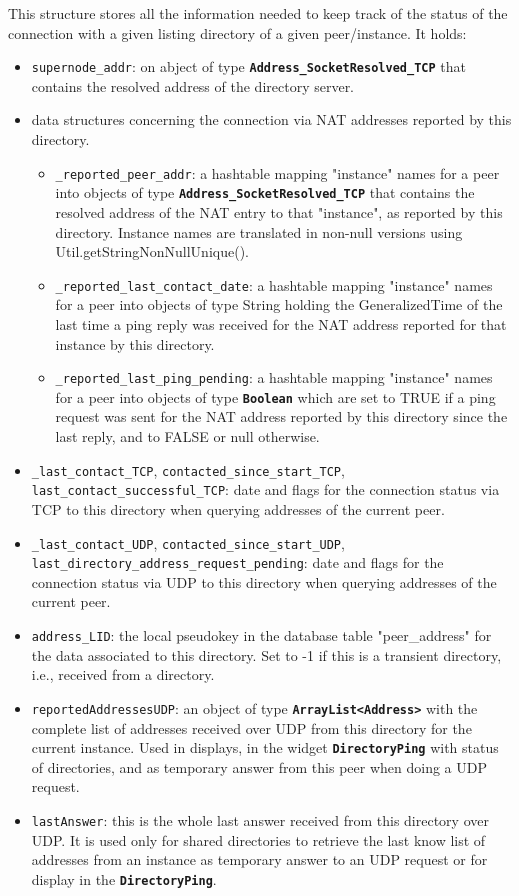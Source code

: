 \documentclass{book}
\newcommand{\cls}[1]{{\tt\bf #1}}
\newcommand{\mmb}[1]{{\tt #1}}
\begin{document}
This structure stores all the information needed to keep track of the status of the connection with a given listing directory of a given
peer/instance. It holds:
\begin{itemize}
\item
\mmb{supernode\_addr}: on abject of type \cls{Address\_SocketResolved\_TCP} that contains the resolved address of the directory server.
\item data structures concerning the connection via NAT addresses reported by this directory.
 \begin{itemize}
 \item
 \mmb{\_reported\_peer\_addr}: a hashtable mapping "instance" names for a peer into objects of type \cls{Address\_SocketResolved\_TCP} that contains the resolved address of the NAT entry to that "instance", as reported by this directory. Instance names are translated in non-null
versions using Util.getStringNonNullUnique().
 \item
 \mmb{\_reported\_last\_contact\_date}: a hashtable mapping "instance" names for a peer into objects of type String holding the GeneralizedTime of the last time a ping reply was received for the NAT address reported for that instance by this directory.
 \item
 \mmb{\_reported\_last\_ping\_pending}: a hashtable mapping "instance" names for a peer into objects of type \cls{Boolean} which are
set to TRUE if a ping request was sent for the NAT address reported by this directory since the last reply, and to FALSE or null otherwise.
 \end{itemize}
\item
\mmb{\_last\_contact\_TCP}, \mmb{contacted\_since\_start\_TCP}, \mmb{last\_contact\_successful\_TCP}: date and flags for the connection
status via TCP to this directory when querying addresses of the current peer.
\item
\mmb{\_last\_contact\_UDP}, \mmb{contacted\_since\_start\_UDP}, \mmb{last\_directory\_address\_request\_pending}: date and flags for the connection
status via UDP to this directory when querying addresses of the current peer.
\item
\mmb{address\_LID}: the local pseudokey in the database table "peer\_address" for the data associated to this directory. Set to -1
if this is a transient directory, i.e., received from a directory.
\item
\mmb{reportedAddressesUDP}: an object of type \cls{ArrayList<Address>} with the complete list of addresses received over UDP from
this directory for the current instance. Used in displays, in the widget \cls{DirectoryPing} with status of directories,
and as temporary answer from this peer when doing a UDP request.
%
\item
\mmb{lastAnswer}: this is the whole last answer received from this directory over UDP. It is used only for shared directories to retrieve
the last know list of addresses from an instance as temporary answer to an UDP request or for display in the \cls{DirectoryPing}.
\end{itemize}
\end{document}
